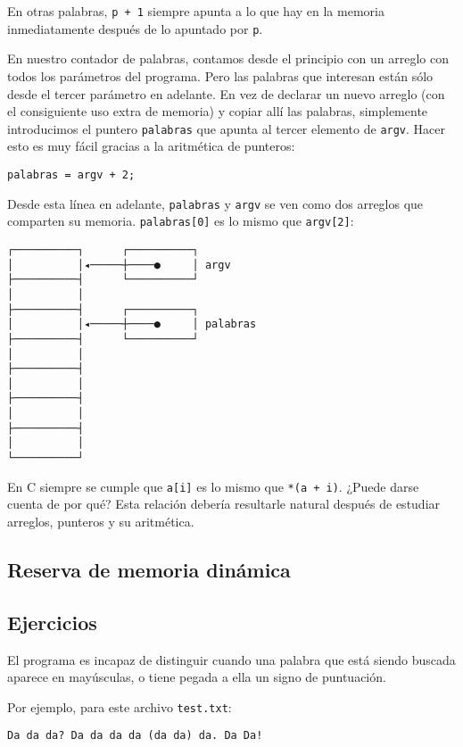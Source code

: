 En otras palabras, \lstinline!p + 1! siempre apunta a lo que hay en la
memoria inmediatamente después de lo apuntado por \lstinline!p!.

En nuestro contador de palabras, contamos desde el principio con un
arreglo con todos los parámetros del programa. Pero las palabras que
interesan están sólo desde el tercer parámetro en adelante. En vez de
declarar un nuevo arreglo (con el consiguiente uso extra de memoria) y
copiar allí las palabras, simplemente introducimos el puntero
\lstinline!palabras! que apunta al tercer elemento de \lstinline!argv!.
Hacer esto es muy fácil gracias a la aritmética de punteros:

\begin{lstlisting}
palabras = argv + 2;
\end{lstlisting}

Desde esta línea en adelante, \lstinline!palabras! y \lstinline!argv! se
ven como dos arreglos que comparten su memoria. \lstinline!palabras[0]!
es lo mismo que \lstinline!argv[2]!:

\begin{lstlisting}
┌──────────┐      ┌──────────┐
│          │◂─────┼────●     │ argv
├──────────┤      └──────────┘
│          │
├──────────┤      ┌──────────┐
│          │◂─────┼────●     │ palabras
├──────────┤      └──────────┘
│          │
├──────────┤
│          │
├──────────┤
│          │
├──────────┤
│          │
└──────────┘
\end{lstlisting}

En C siempre se cumple que \lstinline!a[i]! es lo mismo que
\lstinline!*(a + i)!. ¿Puede darse cuenta de por qué? Esta relación
debería resultarle natural después de estudiar arreglos, punteros y su
aritmética.

\subsection{Reserva de memoria dinámica}

\subsection{Ejercicios}

El programa es incapaz de distinguir cuando una palabra que está siendo
buscada aparece en mayúsculas, o tiene pegada a ella un signo de
puntuación.

Por ejemplo, para este archivo \lstinline!test.txt!:

\begin{lstlisting}
Da da da? Da da da da (da da) da. Da Da!
\end{lstlisting}

